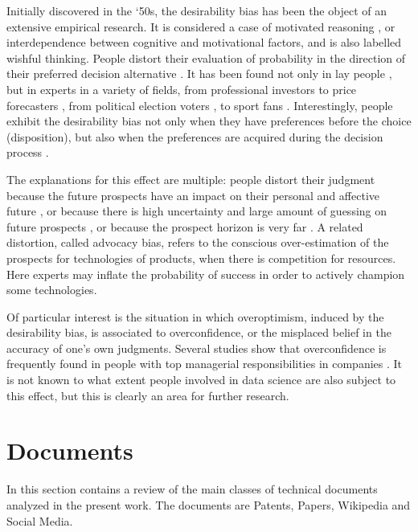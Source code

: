 \documentclass[b5paper,]{book}
\theoremstyle{definition}
\theoremstyle{definition}
\theoremstyle{definition}
\theoremstyle{remark}
\begin{document}
Initially discovered in the `50s, the desirability bias has been the
object of an extensive empirical research. It is considered a case of
motivated reasoning \citep{kunda1990case}, or interdependence between
cognitive and motivational factors, and is also labelled wishful
thinking. People distort their evaluation of probability in the
direction of their preferred decision alternative
\citep{dekay2009distortion}. It has been found not only in lay people
\citep{lench2012automatic}, but in experts in a variety of fields, from
professional investors to price forecasters , from political election
voters , to sport fans . Interestingly, people exhibit the desirability
bias not only when they have preferences before the choice
(disposition), but also when the preferences are acquired during the
decision process \citep{russo1996distortion}.

The explanations for this effect are multiple: people distort their
judgment because the future prospects have an impact on their personal
and affective future
\citep{ayton1989psychological, wright1996role, lench2008automatic}, or
because there is high uncertainty and large amount of guessing on future
prospects \citep{windschitl2010desirability}, or because the prospect
horizon is very far \citep{vosgerau2010prevalent}. A related distortion,
called advocacy bias, refers to the conscious over-estimation of the
prospects for technologies of products, when there is competition for
resources. Here experts may inflate the probability of success in order
to actively champion some technologies.

Of particular interest is the situation in which overoptimism, induced
by the desirability bias, is associated to overconfidence, or the
misplaced belief in the accuracy of one's own judgments. Several studies
show that overconfidence is frequently found in people with top
managerial responsibilities in companies \citep{hribar2016ceo}. It is
not known to what extent people involved in data science are also
subject to this effect, but this is clearly an area for further
research.

\chapter{Documents}\label{sotadocuments}

In this section contains a review of the main classes of technical
documents analyzed in the present work. The documents are Patents,
Papers, Wikipedia and Social Media.
\end{document}
